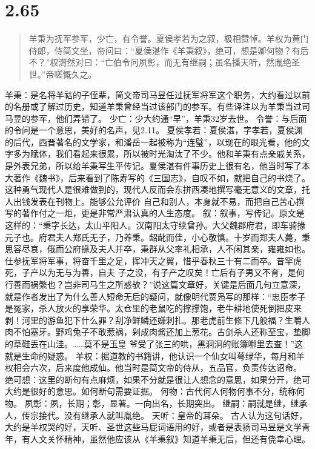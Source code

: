 \documentclass[]{book}
\begin{document}
\section{2.65}\label{section-111}

\begin{quote}
羊秉为抚军参军，少亡，有令誉。夏侯孝若为之叙，极相赞悼。羊权为黄门侍郎，侍简文坐，帝问曰：``夏侯湛作《羊秉叙》，绝可，想是卿何物？有后不？''权潸然对曰：``亡伯令问夙彰，而无有继嗣；虽名播天听，然胤绝圣世。''帝嗟慨久之。
\end{quote}

羊秉：是名将羊祜的子侄辈，简文帝司马昱任过抚军将军这个职务，大约看过以前的名册或了解过历史，知道羊秉曾经当过该部门的参军。有些译注以为羊秉当过司马昱的参军，他们弄错了。
少亡：少大约通``早''，羊秉32岁去世。
令誉：与后面的令问是一个意思，美好的名声，见2.11。
夏侯孝若：夏侯湛，字孝若，夏侯渊的后代，西晋著名的文学家，和潘岳一起被称为``连璧''，以现在的眼光看，他的文字多为赋体，我们看起来很累，所以被时光淘汰了不少。他和羊秉有点亲戚关系，是外表兄弟，所以给羊秉写生平传记。夏侯湛有件事历史上很有名，他当时写了本大著作《魏书》，后来看到了陈寿写的《三国志》，自叹不如，就把自己的书烧了。这种勇气现代人是很难做到的，现代人反而会东拼西凑地撰写毫无意义的文章，托人出钱发表在刊物上。能够公允评价
自己和别人，本身就不易，而把自己苦心撰写的著作付之一炬，更是非常严肃认真的人生态度。
叙：叙事，写传记。原文是这样的：``秉字长达，太山平阳人。汉南阳太守续曾孙。大父魏郡府君，即车骑掾元子也。府君夫人郑氏无子，乃养秉。龆龀而佳，小心敬慎。十岁而郑夫人薨，秉思容尽哀，俄而公府掾及夫人并卒，秉群从父率礼相承，人不闲其亲，雍雍如也。仕参抚军将军事，将奋千里之足，挥冲天之翼，惜乎春秋三十有二而卒。昔罕虎死，子产以为无与为善，自夫
子之没，有子产之叹矣！亡后有子男又不育，是何行善而祸繁也？岂非司马生之所惑欤？''说这篇文章好，关键是后面几句立意深，就是作者发出了为什么善人短命无后的疑问，就像明代贾凫写的那样：``忠臣孝子是冤家，杀人放火的享荣华。太仓里的老鼠吃的撑撑饱，老牛耕地使死倒把皮来剥！河里的游鱼犯下什么罪？刮净鲜鳞还嫌刺扎。那老虎前生修下几般福？生嚼人肉不怕塞牙。野鸡兔子不敢惹祸，剁成肉酱还加上葱花。古剑杀人还称至宝，垫脚的草鞋丢在山洼。\ldots{}\ldots{}莫不是玉皇
爷受了张三的哄，黑洞洞的账簿哪里去查！''这就是生命的疑惑。
羊权：据道教的书籍讲，他认识一个仙女叫萼绿华，每月和羊权相会六次，后来度他成仙。他当时是简文帝的侍从，五品官，负责传达诏命。
绝可想：这里的断句有点麻烦，如果不分就是很让人想念的意思，如果分开，绝可大约是很好的意思。如何断句需要证据。
何物：古代何人何物何事不分，统称何物。
夙彰：夙，长期；彰，显著。一向出名，长期突出。
继嗣：嗣就是继，继承人，传宗接代。没有继承人就叫胤绝。
天听：皇帝的耳朵。
古人认为这句话好，大约是羊权哭的好，天听、圣世这些马屁词语用的好，或者是表扬司马昱是文学青年，有人文关怀精神，虽然他应该从《羊秉叙》知道羊秉无后，但还有侥幸心理。
\end{document}
